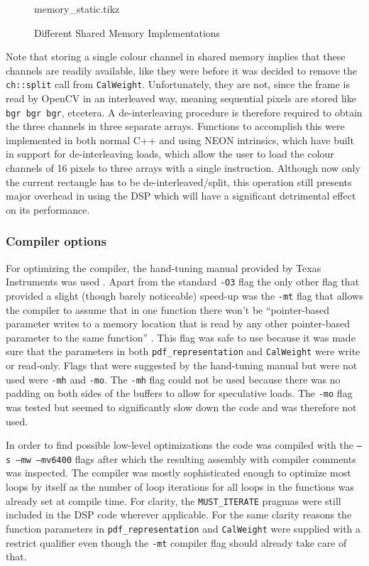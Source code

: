 \documentclass[final]{article}
\begin{document}
\begin{figure}[H]
    {memory_static.tikz}
    \caption{Different Shared Memory Implementations}
    \label{fig:memory}
\end{figure}

Note that storing a single colour channel in shared memory implies that these channels are readily available, like they were before it was decided to remove the \texttt{ch::split} call from \texttt{CalWeight}.
Unfortunately, they are not, since the frame is read by OpenCV in an interleaved way, meaning sequential pixels are stored like \texttt{bgr bgr bgr}, etcetera.
A de-interleaving procedure is therefore required to obtain the three channels in three separate arrays.
Functions to accomplish this were implemented in both normal C++ and using NEON intrinsics, which have built in support for de-interleaving loads, which allow the user to load the colour channels of 16 pixels to three arrays with a single instruction.
Although now only the current rectangle has to be de-interleaved/split, this operation still presents major overhead in using the DSP which will have a significant detrimental effect on its performance.

\subsubsection{Compiler options}
For optimizing the compiler, the hand-tuning manual provided by Texas Instruments was used \cite{handtuning}.
Apart from the standard \texttt{-O3} flag the only other flag that provided a slight (though barely noticeable) speed-up was the \texttt{-mt} flag that allows the compiler to assume that in one function there won't be ``pointer-based parameter writes to a memory location that is read by any other pointer-based parameter to the same function'' \cite{handtuning}.
This flag was safe to use because it was made sure that the parameters in both \texttt{pdf\_representation} and \texttt{CalWeight} were write or read-only.
Flags that were suggested by the hand-tuning manual but were not used were \texttt{-mh} and \texttt{-mo}.
The \texttt{-mh} flag could not be used because there was no padding on both sides of the buffers to allow for speculative loads.
The \texttt{-mo} flag was tested but seemed to significantly slow down the code and was therefore not used.

In order to find possible low-level optimizations the code was compiled with the \texttt{–s –mw –mv6400} flags after which the resulting assembly with compiler comments was inspected. The compiler was mostly sophisticated enough to optimize most loops by itself as the number of loop iterations for all loops in the functions was already set at compile time. For clarity, the \texttt{MUST\_ITERATE} pragmas were still included in the DSP code wherever applicable. For the same clarity reasons the function parameters in \texttt{pdf\_representation} and \texttt{CalWeight} were supplied with a restrict qualifier even though the \texttt{-mt} compiler flag should already take care of that.
\end{document}
